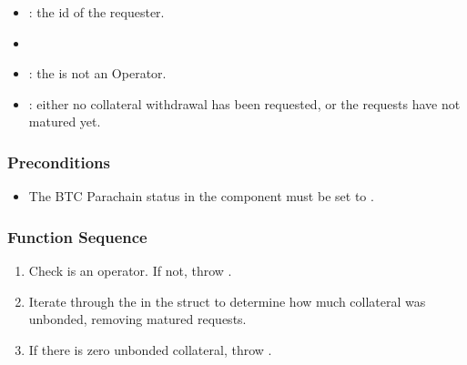 \documentclass[a4paper,10pt,english]{sphinxmanual}
\begin{document}
\begin{itemize}
\item {} 
: the id of the requester.

\end{itemize}

\begin{itemize}
\item {} 

\end{itemize}

\begin{itemize}
\item {} 
: the  is not an Operator.

\item {} 
: either no collateral withdrawal has been requested, or the requests have not matured yet.

\end{itemize}


\subsubsection{Preconditions}
\label{\detokenize{spec/nomination:id27}}\begin{itemize}
\item {} 
The BTC Parachain status in the {\hyperref[\detokenize{spec/security:security}]{}} component must be set to .

\end{itemize}


\subsubsection{Function Sequence}
\label{\detokenize{spec/nomination:id28}}\begin{enumerate}
%
\item {} 
Check  is an operator. If not, throw .

\item {} 
Iterate through the  in the  struct to determine how much collateral was unbonded, removing matured requests.

\item {} 
If there is zero unbonded collateral, throw .

\end{enumerate}
\end{document}
